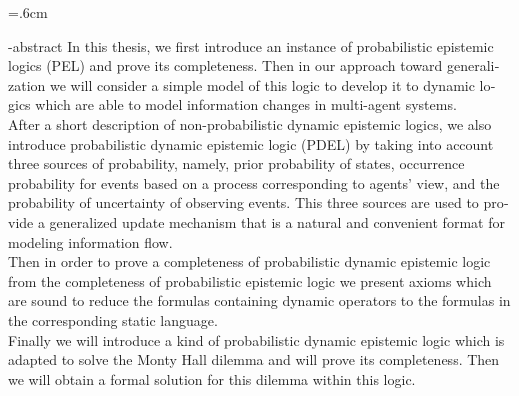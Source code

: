 \baselineskip=.6cm
\begin{latin}
\en-abstract{\noindent
In this thesis, we first introduce an instance of probabilistic epistemic logics (PEL) and prove its completeness. Then in our approach toward generalization we will consider a simple model of this logic to develop it to dynamic logics which are able to model information changes in multi-agent systems.
\\
After a short description of non-probabilistic dynamic epistemic logics, we also introduce probabilistic dynamic epistemic logic (PDEL) by taking into account three sources of probability, namely, prior probability of states, occurrence probability for events based on a process corresponding to agents’ view, and the probability of uncertainty of observing events. This three sources are used to provide a generalized update mechanism that is a natural and convenient format for modeling information flow.
\\
Then in order to prove a completeness of probabilistic dynamic epistemic logic from the completeness of probabilistic epistemic logic we present axioms which are sound to reduce the formulas containing dynamic operators to the formulas in the corresponding static language.
\\
Finally we will introduce a kind of probabilistic dynamic epistemic logic which is adapted to solve the Monty Hall dilemma and will prove its completeness. Then we will obtain a formal solution for this dilemma within this logic.
}
\latinvtitle
\end{latin}